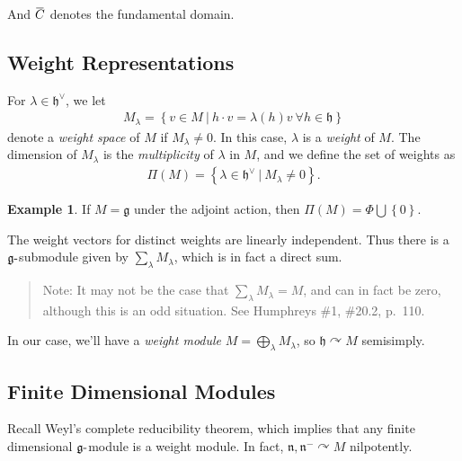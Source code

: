 \documentclass[11pt]{scrartcl}
\theoremstyle{definition}
\theoremstyle{theorem}
\theoremstyle{proof}
\theoremstyle{definition}
\theoremstyle{break}
\newtheorem{example}{Example}[section]
\theoremstyle{problem}
\providecommand{\tightlist}{%
  \setlength{\itemsep}{0pt}\setlength{\parskip}{0pt}}
\newcommand{\actson}[0]{\curvearrowright}
\newcommand{\dash}[0]{{\hbox{-}}}
\newcommand{\dual}[0]{^\vee}
\newcommand{\lieg}[0]{{\mathfrak{g}}}
\newcommand{\lieh}[0]{{\mathfrak{h}}}
\newcommand{\lien}[0]{{\mathfrak{n}}}
\newcommand{\suchthat}[0]{{~\mathrel{\Big|}~}}
\newcommand{\theset}[1]{\left\{{#1}\right\}}
\newcommand{\union}[0]{\bigcup}
\renewcommand{\bar}[1]{\mkern 1.5mu\overline{\mkern-1.5mu#1\mkern-1.5mu}\mkern 1.5mu}
\begin{document}
And \(\bar C\) denotes the fundamental domain.

\hypertarget{weight-representations}{%
\subsection{Weight Representations}\label{weight-representations}}

For \(\lambda \in \lieh\dual\), we let
\begin{align*}M_\lambda = \theset{v\in M \suchthat h\cdot v = \lambda(h) v ~\forall h\in\lieh}\end{align*}
denote a \emph{weight space} of \(M\) if \(M_\lambda \neq 0\). In this
case, \(\lambda\) is a \emph{weight} of \(M\). The dimension of
\(M_\lambda\) is the \emph{multiplicity} of \(\lambda\) in \(M\), and we
define the set of weights as
\begin{align*}\Pi(M) = \theset{\lambda \in \lieh\dual \suchthat M_\lambda \neq 0}.\end{align*}

\begin{example}

If \(M = \lieg\) under the adjoint action, then
\(\Pi(M) = \Phi \union \theset{0}\).\end{example}

\begin{description}
\tightlist
\item[Remark]
The weight vectors for distinct weights are linearly independent. Thus
there is a \(\lieg\dash\)submodule given by \(\sum_\lambda M_\lambda\),
which is in fact a direct sum.
\end{description}

\begin{quote}
Note: It may not be the case that \(\sum_\lambda M_\lambda = M\), and
can in fact be zero, although this is an odd situation. See Humphreys
\#1, \#20.2, p.~110.
\end{quote}

In our case, we'll have a \emph{weight module}
\(M = \bigoplus_\lambda M_\lambda\), so \(\lieh\actson M\) semisimply.

\hypertarget{finite-dimensional-modules}{%
\subsection{Finite Dimensional
Modules}\label{finite-dimensional-modules}}

Recall Weyl's complete reducibility theorem, which implies that any
finite dimensional \(\lieg\dash\)module is a weight module. In fact,
\(\lien, \lien^- \actson M\) nilpotently.
\end{document}
